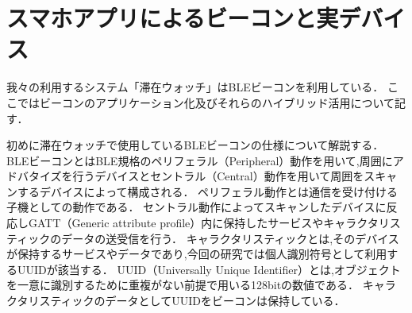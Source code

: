 \section{スマホアプリによるビーコンと実デバイス}\label{4.3}
我々の利用するシステム「滞在ウォッチ」はBLEビーコンを利用している．
ここではビーコンのアプリケーション化及びそれらのハイブリッド活用について記す．

初めに滞在ウォッチで使用しているBLEビーコンの仕様について解説する．
BLEビーコンとはBLE規格のペリフェラル（Peripheral）動作を用いて,周囲にアドバタイズを行うデバイスとセントラル（Central）動作を用いて周囲をスキャンするデバイスによって構成される．
ペリフェラル動作とは通信を受け付ける子機としての動作である．
セントラル動作によってスキャンしたデバイスに反応しGATT（Generic attribute profile）内に保持したサービスやキャラクタリスティックのデータの送受信を行う．
キャラクタリスティックとは,そのデバイスが保持するサービスやデータであり,今回の研究では個人識別符号として利用するUUIDが該当する．
UUID（Universally Unique Identifier）とは,オブジェクトを一意に識別するために重複がない前提で用いる128bitの数値である．
キャラクタリスティックのデータとしてUUIDをビーコンは保持している．










